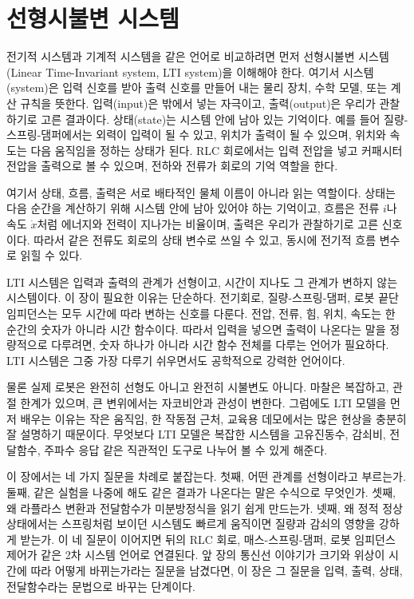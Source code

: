 \section{선형시불변 시스템}

전기적 시스템과 기계적 시스템을 같은 언어로 비교하려면 먼저 선형시불변 시스템(Linear Time-Invariant system, LTI system)을 이해해야 한다.
여기서 시스템(system)은 입력 신호를 받아 출력 신호를 만들어 내는 물리 장치, 수학 모델, 또는 계산 규칙을 뜻한다.
입력(input)은 밖에서 넣는 자극이고, 출력(output)은 우리가 관찰하기로 고른 결과이다.
상태(state)는 시스템 안에 남아 있는 기억이다.
예를 들어 질량-스프링-댐퍼에서는 외력이 입력이 될 수 있고, 위치가 출력이 될 수 있으며, 위치와 속도는 다음 움직임을 정하는 상태가 된다.
RLC 회로에서는 입력 전압을 넣고 커패시터 전압을 출력으로 볼 수 있으며, 전하와 전류가 회로의 기억 역할을 한다.

여기서 상태, 흐름, 출력은 서로 배타적인 물체 이름이 아니라 읽는 역할이다.
상태는 다음 순간을 계산하기 위해 시스템 안에 남아 있어야 하는 기억이고, 흐름은 전류 $i$나 속도 $\dot{x}$처럼 에너지와 전력이 지나가는 비율이며, 출력은 우리가 관찰하기로 고른 신호이다.
따라서 같은 전류도 회로의 상태 변수로 쓰일 수 있고, 동시에 전기적 흐름 변수로 읽힐 수 있다.

LTI 시스템은 입력과 출력의 관계가 선형이고, 시간이 지나도 그 관계가 변하지 않는 시스템이다.
이 장이 필요한 이유는 단순하다.
전기회로, 질량-스프링-댐퍼, 로봇 끝단 임피던스는 모두 시간에 따라 변하는 신호를 다룬다.
전압, 전류, 힘, 위치, 속도는 한 순간의 숫자가 아니라 시간 함수이다.
따라서 입력을 넣으면 출력이 나온다는 말을 정량적으로 다루려면, 숫자 하나가 아니라 시간 함수 전체를 다루는 언어가 필요하다.
LTI 시스템은 그중 가장 다루기 쉬우면서도 공학적으로 강력한 언어이다.

물론 실제 로봇은 완전히 선형도 아니고 완전히 시불변도 아니다.
마찰은 복잡하고, 관절 한계가 있으며, 큰 변위에서는 자코비안과 관성이 변한다.
그럼에도 LTI 모델을 먼저 배우는 이유는 작은 움직임, 한 작동점 근처, 교육용 데모에서는 많은 현상을 충분히 잘 설명하기 때문이다.
무엇보다 LTI 모델은 복잡한 시스템을 고유진동수, 감쇠비, 전달함수, 주파수 응답 같은 직관적인 도구로 나누어 볼 수 있게 해준다.

이 장에서는 네 가지 질문을 차례로 붙잡는다.
첫째, 어떤 관계를 선형이라고 부르는가.
둘째, 같은 실험을 나중에 해도 같은 결과가 나온다는 말은 수식으로 무엇인가.
셋째, 왜 라플라스 변환과 전달함수가 미분방정식을 읽기 쉽게 만드는가.
넷째, 왜 정적 정상상태에서는 스프링처럼 보이던 시스템도 빠르게 움직이면 질량과 감쇠의 영향을 강하게 받는가.
이 네 질문이 이어지면 뒤의 RLC 회로, 매스-스프링-댐퍼, 로봇 임피던스 제어가 같은 2차 시스템 언어로 연결된다.
앞 장의 통신선 이야기가 크기와 위상이 시간에 따라 어떻게 바뀌는가라는 질문을 남겼다면, 이 장은 그 질문을 입력, 출력, 상태, 전달함수라는 문법으로 바꾸는 단계이다.

